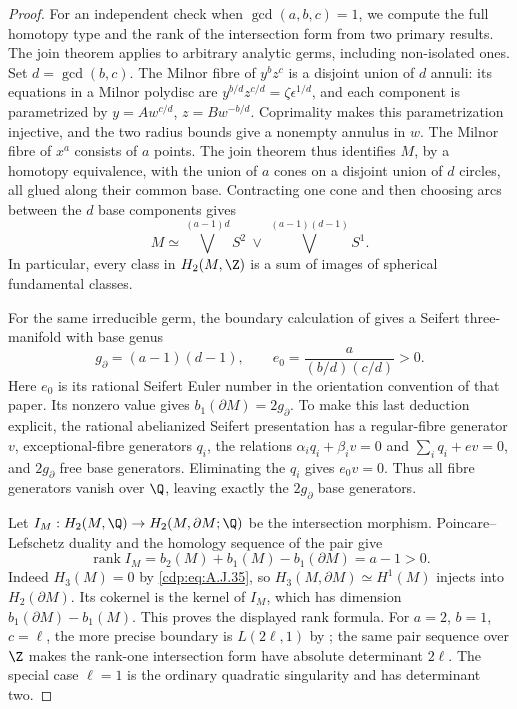 \begin{proof}
For an independent check when $\gcd(a,b,c)=1$,
we compute the full homotopy type and the rank of
the intersection form from two primary results.
The join theorem
\cite[Theorem L1 and Example 2.4(a)]{Nemethi1991Join}
applies to arbitrary analytic germs, including
non-isolated ones. Set $d=\gcd(b,c)$. The Milnor
fibre of $y^bz^c$ is a disjoint union of $d$ annuli:
its equations in a Milnor polydisc are
$y^{b/d}z^{c/d}=\zeta\epsilon^{1/d}$, and each
component is parametrized by
$y=A w^{c/d}$, $z=B w^{-b/d}$. Coprimality makes
this parametrization injective, and the two radius
bounds give a nonempty annulus in $w$.
The Milnor fibre of $x^a$ consists of $a$ points.
The join theorem thus identifies $M$, by a homotopy
equivalence, with the union of $a$ cones on a
disjoint union of $d$ circles, all glued along their
common base. Contracting one cone and then choosing
arcs between the $d$ base components gives
\[
 M\simeq
 \bigvee^{(a-1)d}S^2\ \vee\
 \bigvee^{(a-1)(d-1)}S^1.                          \tag{A.J.35}\label{cdp:eq:A.J.35}
\]
In particular, every class in $H_2(M,\Z)$ is a sum
of images of spherical fundamental classes.

For the same irreducible germ, the boundary calculation
of \cite[Theorem 4.1 and Lemma 4.6]{MPW2005Hirzebruch}
gives a Seifert three-manifold with base genus
\[
 g_\partial=(a-1)(d-1),\qquad
 e_0=\frac{a}{(b/d)(c/d)}>0.                     \tag{A.J.36}\label{cdp:eq:A.J.36}
\]
Here $e_0$ is its rational Seifert Euler number in
the orientation convention of that paper. Its
nonzero value gives
$b_1(\partial M)=2g_\partial$. To make this last
deduction explicit, the rational abelianized Seifert
presentation has a regular-fibre generator $v$,
exceptional-fibre generators $q_i$, the relations
$\alpha_iq_i+\beta_iv=0$ and
$\sum_iq_i+ev=0$, and $2g_\partial$ free base
generators. Eliminating the $q_i$ gives $e_0v=0$.
Thus all fibre generators vanish over $\Q$, leaving
exactly the $2g_\partial$ base generators.

Let $I_M:H_2(M,\Q)\to H_2(M,\partial M;\Q)$ be
the intersection morphism. Poincare--Lefschetz duality
and the homology sequence of the pair give
\[
 \operatorname{rank} I_M
   =b_2(M)+b_1(M)-b_1(\partial M)=a-1>0.          \tag{A.J.37}\label{cdp:eq:A.J.37}
\]
Indeed $H_3(M)=0$ by \eqref{cdp:eq:A.J.35}, so
$H_3(M,\partial M)\simeq H^1(M)$ injects into
$H_2(\partial M)$. Its cokernel is the kernel of
$I_M$, which has dimension
$b_1(\partial M)-b_1(M)$. This proves the displayed
rank formula. For $a=2$, $b=1$, $c=\ell$, the
more precise boundary is $L(2\ell,1)$ by
\cite[Theorem 4.2(2)]{MPW2005Hirzebruch}; the same
pair sequence over $\Z$ makes the rank-one
intersection form have absolute determinant
$2\ell$. The special case $\ell=1$ is the ordinary
quadratic singularity and has determinant two.


\end{proof}
